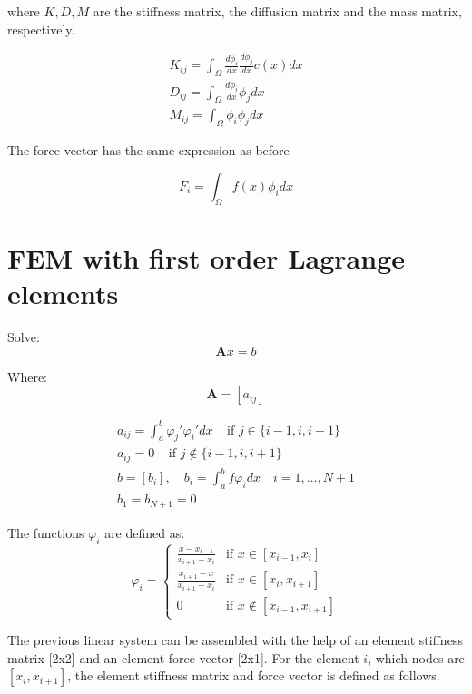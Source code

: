 \documentclass{article}
\begin{document}
where $K,D,M$ are the stiffness matrix, the diffusion matrix and the mass matrix, respectively. 

\begin{gather*}
    K_{ij} = \int_{\Omega} \frac{d \phi_i}{dx} \frac{d \phi_j}{dx} c(x) dx \\
    D_{ij} = \int_{\Omega} \frac{d \phi_i}{dx} \phi_j dx \\
    M_{ij} = \int_{\Omega} \phi_i \phi_j dx 
\end{gather*}

The force vector has the same expression as before

\begin{equation}
    F_i = \int_{\Omega} f(x) \phi_i dx
\end{equation}

\section{FEM with first order Lagrange elements}
\noindent Solve:
\begin{equation*}
    \textbf{A}x=b
\end{equation*}

\noindent Where:
\begin{equation*}
    \textbf{A}=[a_{ij}]
\end{equation*}

\begin{equation}
\begin{gathered}
     a_{ij}=\int_a^b \varphi_j' \varphi_i' dx \;\;\;\;\text{if } j\in\{ i-1,i,i+1\}  \\
     a_{ij}=0 \;\;\;\;\text{if } j\notin\{ i-1,i,i+1\} \\
     b=[b_i], \quad b_{i}=\int_a^b f \varphi_i dx \quad
     i=1,...,N+1 \\
     b_1 = b_{N+1} = 0 
\end{gathered}
\end{equation}



\noindent The functions $\varphi_i$ are defined as:
\[\varphi_i= \left\{
\begin{array}{rcl}
\frac{x-x_{i-1}}{x_{i+1}-x_{i}}& \text{if } x\in [x_{i-1}, x_i]\\
\frac{x_{i+1}-x}{x_{i+1}-x_{i}}& \text{if } x\in [x_{i}, x_{i+1}]\\
0& \text{if } x\notin [x_{i-1}, x_{i+1}]
\end{array}\right.\]

\noindent The previous linear system can be assembled with the help of an element stiffness matrix [2x2] and an element force vector [2x1]. For the element $i$, which nodes are $[x_i,x_{i+1}]$, the element stiffness matrix and force vector is defined as follows.
\end{document}
